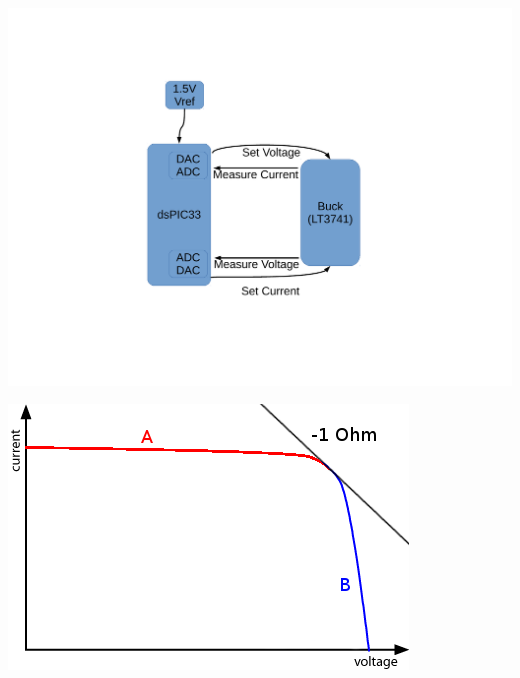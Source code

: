 \begin{minipage}{0.5\textwidth}
    \center
    \includegraphics[width=\textwidth,trim=140 140 120 100,clip]{images/block-diag-control.pdf}
    \label{fig:controlcircuit:schcematic}
\end{minipage}
\begin{minipage}{0.5\textwidth}
    \center
    \includegraphics[width=\textwidth]{images/vi-curve.png}
    \label{fig:controlcircuit:vicurve}
\end{minipage}
